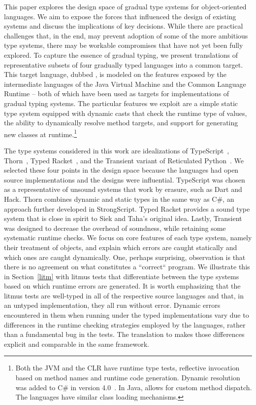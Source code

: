 \documentclass[acmlarge, anonymous, authordraft, review]{acmart} %
\begin{document}
This paper explores the design space of gradual type systems for
object-oriented languages. We aim to expose the forces that influenced the
design of existing systems and discuss the implications of key
decisions. While there are practical challenges that, in the end, may
prevent adoption of some of the more ambitious type systems, there may be
workable compromises that have not yet been fully explored.  To capture the
essence of gradual typing, we present translations of representative subsets
of four gradually typed languages into a common target. This target
language, dubbed \kafka, is modeled on the features exposed by the intermediate
languages of the Java Virtual Machine and the Common Language Runtime -- both
of which have been used as targets for implementations of gradual typing
systems.  The particular features we exploit are a simple static type system
equipped with dynamic casts that check the runtime type of values, the
ability to dynamically resolve method targets, and support for generating
new classes at runtime.\footnote{Both the JVM and the CLR have runtime type
  tests, reflective invocation based on method names and runtime code
  generation. Dynamic resolution was added to C\# in version
  4.0~\cite{BAT14}. In Java,  allows for custom method
  dispatch. The languages have similar class loading mechanisms.}

The type systems considered in this work are idealizations of
TypeScript~\cite{BAT14}, Thorn~\cite{oopsla09}, Typed Racket~\cite{tf-popl08},
and the Transient variant of Reticulated Python~\cite{siek14}. We selected
these four points in the design space because the languages had open source
implementations and the designs were influential.  TypeScript was chosen as a
representative of unsound systems that work by erasure, such as Dart and Hack.
Thorn combines dynamic and static types in the same way as C\#, an approach
further developed in StrongScript. Typed Racket provides a sound type system
that is close in spirit to Siek and Taha's original idea. Lastly, Transient
was designed to decrease the overhead of soundness, while retaining some
systematic runtime checks.  We focus on core features of each type system,
namely their treatment of objects, and explain which errors are caught
statically and which ones are caught dynamically. One, perhaps surprising,
observation is that there is no agreement on what constitutes a ``correct``
program.  We illustrate this in Section~\ref{litm} with litmus tests that
differentiate between the type systems based on which runtime errors are
generated. It is worth emphasizing that the litmus tests are well-typed in all
of the respective source languages and that, in an untyped implementation,
they all run without error.  Dynamic errors encountered in them when running
under the typed implementations vary due  to differences in the runtime
checking strategies employed by the languages, rather than a fundamental bug
in the tests.  The translation to \kafka makes those  differences explicit and
comparable in the same framework.
\end{document}
